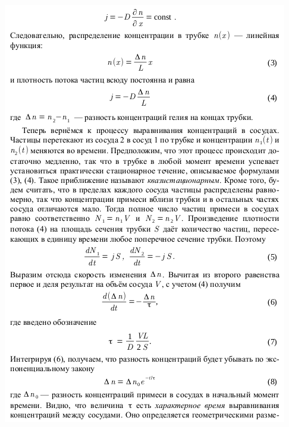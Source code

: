 \documentclass[12pt,a4paper]{article}
\begin{document}
	\newpage	
	\includegraphics[scale=1.5]{3.png}
	\newpage	
\end{document}
